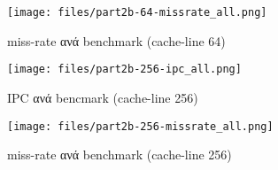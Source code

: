 \documentclass[a4paper,9pt]{article}
\begin{document}
\begin{figure}[H]
    \texttt{[image: files/part2b-64-missrate\_all.png]}
    \caption{miss-rate ανά benchmark (cache-line 64)}
\end{figure}
\begin{figure}[H]
    \texttt{[image: files/part2b-256-ipc\_all.png]}
    \caption{IPC ανά bencmark (cache-line 256)}
\end{figure}

\begin{figure}[H]
    \texttt{[image: files/part2b-256-missrate\_all.png]}
    \caption{miss-rate ανά benchmark (cache-line 256)}
\end{figure}
\end{document}
